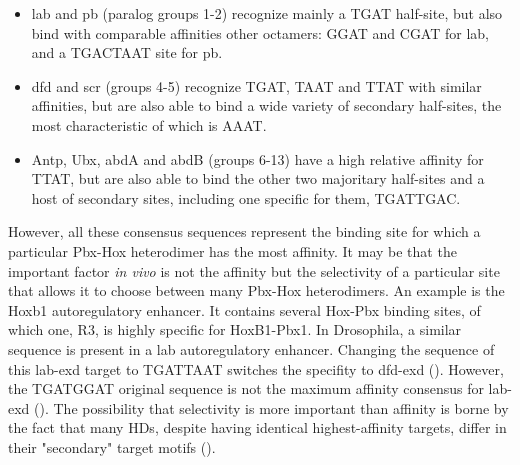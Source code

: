 \begin{itemize}

\item lab and pb (paralog groups 1-2) recognize mainly a TGAT half-site, but also bind with comparable affinities other octamers: GGAT and CGAT for lab, and a TGACTAAT site for pb. 

\item dfd and scr (groups 4-5) recognize TGAT, TAAT and TTAT with similar affinities, but are also able to bind a wide variety of secondary half-sites, the most characteristic of which is AAAT.

\item Antp, Ubx, abdA and abdB (groups 6-13) have a high relative affinity for TTAT, but are also able to bind the other two majoritary half-sites and a host of secondary sites, including one specific for them, TGATTGAC.  

\end{itemize}







However, all these consensus sequences represent the binding site for which a particular Pbx-Hox heterodimer has the most affinity. It may be that the important factor \textit{in vivo} is not the affinity but the selectivity of a particular site that allows it to choose between many Pbx-Hox heterodimers. An example is the Hoxb1 autoregulatory enhancer. It contains several Hox-Pbx binding sites, of which one, R3, is highly specific for HoxB1-Pbx1. In Drosophila, a similar sequence is present in a \ac{lab} autoregulatory enhancer. Changing the sequence of this lab-\ac{exd} target to TGATTAAT switches the specifity to dfd-\ac{exd} (\cite{Chan1997}). However, the TGATGGAT original sequence is not the maximum affinity consensus for lab-\ac{exd} (\cite{Mann1998,Shen1997}). The possibility that selectivity is more important than affinity is borne by the fact that many \acp{HD}, despite having identical highest-affinity targets, differ in their "secondary" target motifs (\cite{Berger2008}).

